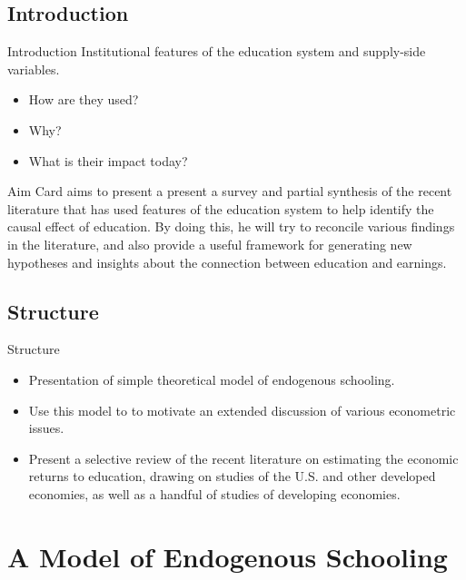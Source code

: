 \documentclass{beamer}
\begin{document}
\subsection{Introduction}
\begin{frame}{Introduction}
Institutional features of the education system and supply-side variables. 
\begin{itemize}
    \item How are they used? 
    \item Why? 
    \item What is their impact today?
\end{itemize}

\begin{block}{Aim}
Card aims to present a present a survey and partial synthesis of the recent literature that has used  features of the education system to help identify the causal effect of education. By doing this, he will try to reconcile various findings in the literature, and also provide a useful framework for generating new hypotheses and insights about the connection between education and earnings.
\end{block}
   
\end{frame}

\subsection{Structure}
\begin{frame}{Structure}
\begin{itemize}
    \item Presentation of simple theoretical model of endogenous schooling.
    \item Use this model to to motivate an extended discussion of various econometric issues.
    \item Present a selective review of the recent literature on estimating the economic returns to education, drawing on studies of the U.S. and other developed economies, as well as a handful of studies of developing economies.
\end{itemize}
    
\end{frame}

\section{A Model of Endogenous Schooling}
\end{document}
